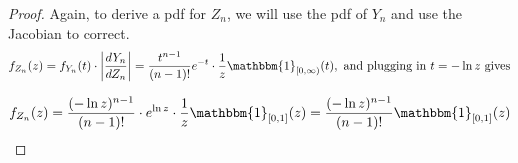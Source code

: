 \documentclass{exam}
\begin{document}
\begin{questions}
\begin{parts}
\begin{proof}
        Again, to derive a pdf for $Z_n$, we will use the pdf of $Y_n$ and use the Jacobian to correct.
        $$f_{Z_n}(z) = f_{Y_n}(t) \cdot \abs{\frac{dY_n}{dZ_n}} = \frac{t^{n - 1}}{(n - 1)!}e^{-t}\cdot \frac{1}{z}\mathbbm{1}_{[0, \infty)}(t), \text{ and plugging in } t = -\ln z \text{ gives}$$

        $$f_{Z_n}(z) = \frac{(-\ln z)^{n - 1}}{(n - 1)!}\cdot e^{\ln z}\cdot \frac{1}{z} \mathbbm{1}_{[0, 1]}(z)= \frac{(-\ln z)^{n - 1}}{(n - 1)!}\mathbbm{1}_{[0, 1]}(z)$$
    \end{proof}
\end{parts}
\end{questions}
\end{document}
